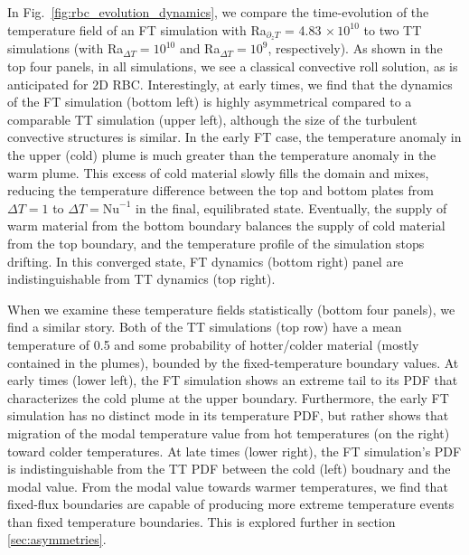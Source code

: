 \documentclass[aps, pre, onecolumn, nofootinbib, notitlepage, groupedaddress, amsfonts, amssymb, amsmath, longbibliography, superscriptaddress]{revtex4-1}
\begin{document}
In Fig.~\ref{fig:rbc_evolution_dynamics}, we compare the time-evolution of the temperature field of an FT simulation with Ra$_{\partial_z T}$ = 4.83$\,\times 10^{10}$ to two TT simulations (with Ra$_{\Delta T} = 10^{10}$ and Ra$_{\Delta T} = 10^9$, respectively).
As shown in the top four panels, in all simulations, we see a classical convective roll solution, as is anticipated for 2D RBC.
Interestingly, at early times, we find that the dynamics of the FT simulation (bottom left) is highly asymmetrical compared to a comparable TT simulation (upper left), although the size of the turbulent convective structures is similar.
In the early FT case, the temperature anomaly in the upper (cold) plume is much greater than the temperature anomaly in the warm plume.
This excess of cold material slowly fills the domain and mixes, reducing the temperature difference between the top and bottom plates from $\Delta T = 1$ to $\Delta T = \text{Nu}^{-1}$ in the final, equilibrated state.
Eventually, the supply of warm material from the bottom boundary balances the supply of cold material from the top boundary, and the temperature profile of the simulation stops drifting.
In this converged state, FT dynamics (bottom right) panel are indistinguishable from TT dynamics (top right).

When we examine these temperature fields statistically (bottom four panels), we find a similar story.
Both of the TT simulations (top row) have a mean temperature of 0.5  and some probability of hotter/colder material (mostly contained in the plumes), bounded by the fixed-temperature boundary values.
At early times (lower left), the FT simulation shows an extreme tail to its PDF that characterizes the cold plume at the upper boundary.
Furthermore, the early FT simulation has no distinct mode in its temperature PDF, but rather shows that migration of the modal temperature value from hot temperatures (on the right) toward colder temperatures.
At late times (lower right), the  FT simulation's PDF is indistinguishable from the TT PDF between the cold (left) boudnary and the modal value.
From the modal value towards warmer temperatures, we find that fixed-flux boundaries are capable of producing more extreme temperature events than fixed temperature boundaries.
This is explored further in section \ref{sec:asymmetries}.
\end{document}
